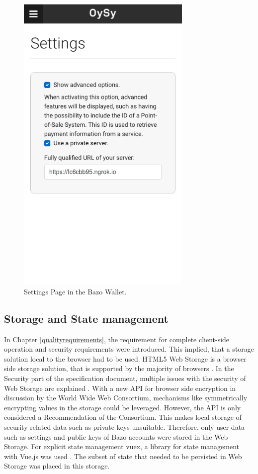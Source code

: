 \begin{figure}
\centering
\includegraphics[width=0.75\textwidth]{screenshots/Settings.png}
\caption{\label{fig:uisettings}Settings Page in the Bazo Wallet.}
\end{figure}


\subsection{Storage and State management\label{storageandstate}}
In Chapter \ref{qualityrequirements}, the requirement for complete client-side operation and security requirements were introduced. This implied, that a storage solution local to the browser had to be used. HTML5 Web Storage is a browser side storage solution, that is supported by the majority of browsers \cite{localstoragetest} \cite{localstorage}.
In the Security part of the specification document, multiple issues with the security of Web Storage are explained \cite{localstorage}.
With a new API for browser side encryption in discussion by the World Wide Web Consortium, mechanisms like symmetrically encrypting values in the storage could be leveraged. However, the API is only considered a Recommendation of the Consortium\cite{webcrypto}.
This makes local storage of security related data such as private keys unsuitable. Therefore, only user-data such as settings and public keys of Bazo accounts were stored in the Web Storage. For explicit state management vuex, a library for state management with Vue.js was used \cite{vuex}. The subset of state that needed to be persisted in Web Storage was placed in this storage.
